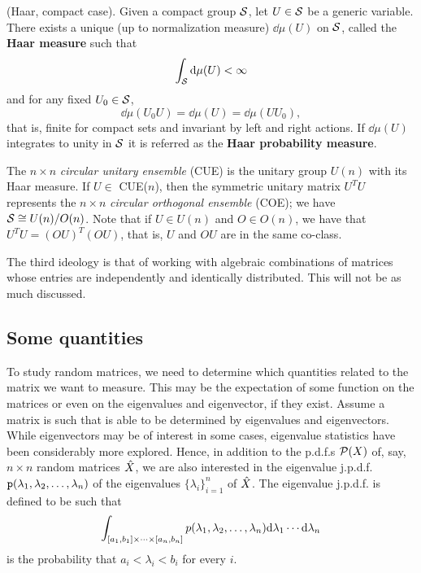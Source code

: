 \begin{thm}
	(Haar, compact case). Given a compact group $\mathcal{S}$, let $U \in \mathcal{S}$ be a generic variable. There exists a unique (up to normalization measure) $\dd \mu(U)$ on $\mathcal{S}$, called the \textbf{Haar measure} such that \begin{equation}\int_{\mathcal{S}} \mathrm{d} \mu(U) < \infty\end{equation} and for any fixed $U_0 \in \mathcal{S}$, $$\dd\mu(U_0U) = \dd\mu(U) = \dd\mu(UU_0),$$ that is, finite for compact sets and invariant by left and right actions. If $\dd \mu(U)$ integrates to unity in $\mathcal{S}$ it is referred as the \textbf{Haar probability measure}.
\end{thm}

\begin{definition}
	The $n \times n$ \textit{circular unitary ensemble} (CUE) is the unitary group $U(n)$ with its Haar measure. If $U \in$ CUE($n$), then the symmetric unitary matrix $U^TU$ represents the $n \times n$ \textit{circular orthogonal ensemble} (COE); we have $\mathcal{S} \cong U(n)/O(n)$. Note that if $U \in U(n)$ and $O \in O(n)$, we have that $U^TU = (OU)^T(OU)$, that is, $U$ and $OU$ are in the same co-class.
\end{definition}

The third ideology is that of working with algebraic combinations of matrices whose entries are independently and identically distributed. This will not be as much discussed.

\subsection{Some quantities}

To study random matrices, we need to determine which quantities related to the matrix we want to measure. This may be the expectation of some function on the matrices or even on the eigenvalues and eigenvector, if they exist. Assume a matrix is such that is able to be determined by eigenvalues and eigenvectors. While eigenvectors may be of interest in some cases, eigenvalue statistics have been considerably more explored. Hence, in addition to the p.d.f.s $\mathcal{P}(X)$ of, say, $n \times n$ random matrices $\hat X$, we are also interested in the eigenvalue j.p.d.f. $\mathtt{p}(\lambda_1, \lambda_2, \dots, \lambda_n)$ of the eigenvalues $\{\lambda_i\}_{i=1}^{n}$ of $\hat X$. The eigenvalue j.p.d.f. is defined to be such that 
\begin{equation}
\int_{[a_1, b_1] \times \cdots \times [a_n, b_n]} p(\lambda_1, \lambda_2, \dots, \lambda_n) \mathrm{d} \lambda_1 \cdots \mathrm{d} \lambda_n
\end{equation}
is the probability that $a_i < \lambda_i < b_i$ for every $i$.

